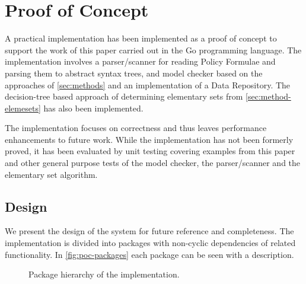 \section{Proof of Concept}\label{app:poc}
A practical implementation has been implemented as a proof of concept to support the work of this paper carried out in the Go programming language. The implementation involves a parser/scanner for reading Policy Formulae and parsing them to abstract syntax trees, and model checker based on the approaches of \ref{sec:methods} and an implementation of a Data Repository. The decision-tree based approach of determining elementary sets from \ref{sec:method-elemesets} has also been implemented.

The implementation focuses on correctness and thus leaves performance enhancements to future work. While the implementation has not been formerly proved, it has been evaluated by unit testing covering examples from this paper and other general purpose tests of the model checker, the parser/scanner and the elementary set algorithm.

\subsection{Design}
We present the design of the system for future reference and completeness. The implementation is divided into packages with non-cyclic dependencies of related functionality. In \autoref{fig:poc-packages} each package can be seen with a description.

\begin{figure}[!ht]
    \centering
    \caption{Package hierarchy of the implementation.}
    \label{fig:poc-packages}
\end{figure}

